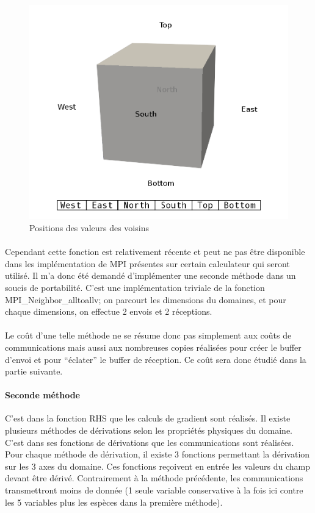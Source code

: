 \begin{figure}[h!]
  \centering
  \includegraphics[scale=0.3]{figures/neighbor_pos.png}
  \caption{\label{fig:neighbor_pos}Positions des valeurs des voisins}
\end{figure}

\paragraph{}Cependant cette fonction est relativement récente et peut ne pas être disponible dans les implémentation de MPI présentes sur certain calculateur qui seront utilisé. Il m'a donc été demandé d'implémenter une seconde méthode dans un soucis de portabilité. C'est une implémentation triviale de la fonction MPI\_Neighbor\_alltoallv; on parcourt les dimensions du domaines, et pour chaque dimensions, on effectue 2 envois et 2 réceptions.

\paragraph{}Le coût d'une telle méthode ne se résume donc pas simplement aux coûts de communications mais aussi aux nombreuses copies réalisées pour créer le buffer d'envoi et pour ``éclater'' le buffer de réception. Ce coût sera donc étudié dans la partie suivante.

\paragraph{Seconde méthode}
C'est dans la fonction RHS que les calculs de gradient sont réalisés. Il existe plusieurs méthodes de dérivations selon les propriétés physiques du domaine. C'est dans ses fonctions de dérivations que les communications sont réalisées. Pour chaque méthode de dérivation, il existe 3 fonctions permettant la dérivation sur les 3 axes du domaine. Ces fonctions reçoivent en entrée les valeurs du champ devant être dérivé. Contrairement à la méthode précédente, les communications transmettront moins de donnée (1 seule variable conservative à la fois ici contre les 5 variables plus les espèces dans la première méthode). 

